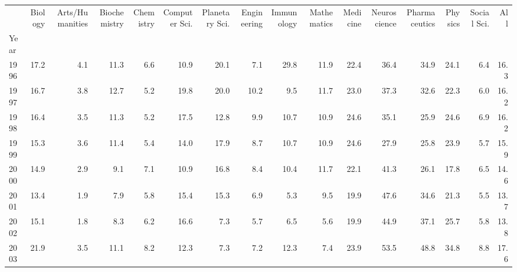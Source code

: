 \begin{tabular}{lrrrrrrrrrrrrrrr}
\toprule
{} &  Biology &  Arts/Humanities &  Biochemistry &  Chemistry &  Computer Sci. &  Planetary Sci. &  Engineering &  Immunology &  Mathematics &  Medicine &  Neuroscience &  Pharmaceutics &  Physics &  Social Sci. &   All \\
Year &          &                  &               &            &                &                 &              &             &              &           &               &                &          &              &       \\
\midrule
1996 &     17.2 &              4.1 &          11.3 &        6.6 &           10.9 &            20.1 &          7.1 &        29.8 &         11.9 &      22.4 &          36.4 &           34.9 &     24.1 &          6.4 &  16.3 \\
1997 &     16.7 &              3.8 &          12.7 &        5.2 &           19.8 &            20.0 &         10.2 &         9.5 &         11.7 &      23.0 &          37.3 &           32.6 &     22.3 &          6.0 &  16.2 \\
1998 &     16.4 &              3.5 &          11.3 &        5.2 &           17.5 &            12.8 &          9.9 &        10.7 &         10.9 &      24.6 &          35.1 &           25.9 &     24.6 &          6.9 &  16.2 \\
1999 &     15.3 &              3.6 &          11.4 &        5.4 &           14.0 &            17.9 &          8.7 &        10.7 &         10.9 &      24.6 &          27.9 &           25.8 &     23.9 &          5.7 &  15.9 \\
2000 &     14.9 &              2.9 &           9.1 &        7.1 &           10.9 &            16.8 &          8.4 &        10.4 &         11.7 &      22.1 &          41.3 &           26.1 &     17.8 &          6.5 &  14.6 \\
2001 &     13.4 &              1.9 &           7.9 &        5.8 &           15.4 &            15.3 &          6.9 &         5.3 &          9.5 &      19.9 &          47.6 &           34.6 &     21.3 &          5.5 &  13.7 \\
2002 &     15.1 &              1.8 &           8.3 &        6.2 &           16.6 &             7.3 &          5.7 &         6.5 &          5.6 &      19.9 &          44.9 &           37.1 &     25.7 &          5.8 &  13.8 \\
2003 &     21.9 &              3.5 &          11.1 &        8.2 &           12.3 &             7.3 &          7.2 &        12.3 &          7.4 &      23.9 &          53.5 &           48.8 &     34.8 &          8.8 &  17.6 \\

\end{tabular}
